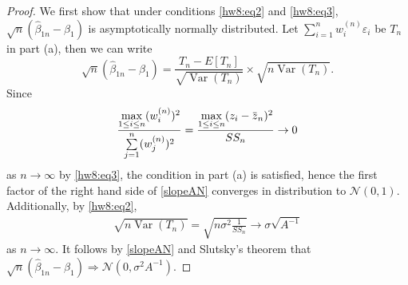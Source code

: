 \documentclass{article}
\newcommand{\eps}{\varepsilon}
\newcommand{\overbar}[1]{\mkern 1.5mu\overline{\mkern-1.5mu#1\mkern-1.5mu}\mkern 1.5mu}
\newcommand{\gaussian}{\mathcal{N}}
\DeclareMathOperator*{\Var}{Var}
\theoremstyle{definition}
\theoremstyle{plain}
\theoremstyle{remark}
\begin{document}
\begin{description}
\begin{description}
\begin{proof}
We first show that under conditions \eqref{hw8:eq2} and \eqref{hw8:eq3}, $\sqrt{n}(\hat{\beta}_{1n} - \beta_1)$ is asymptotically normally distributed. Let $\sum\limits_{i = 1}^n w_i^{(n)} \eps_i$ be $T_n$ in part (a), then 
we can write
\begin{equation}\label{slopeAN}
\sqrt{n}(\hat{\beta}_{1n} - \beta_1) = \frac{T_n - E[T_n]}{\sqrt{\Var(T_n)}} \times \sqrt{n \Var(T_n)}.
\end{equation}
Since
$$\frac{\max\limits_{1 \leq i \leq n} (w_i^{(n)})^2}{\sum\limits_{j = 1}^n (w_j^{(n)})^2} = \frac{\max\limits_{1 \leq i \leq n} (z_i - \overbar{z}_n)^2}{SS_n} \to 0$$
as $n \to \infty$ by \eqref{hw8:eq3}, the condition in part (a) is satisfied, hence the first factor of the right hand side of \eqref{slopeAN} converges in distribution to $\gaussian(0, 1)$. Additionally, by \eqref{hw8:eq2}, 
\begin{align*}
\sqrt{n\Var(T_n)} = \sqrt{n \sigma^2 \frac{1}{SS_n}} \to \sigma \sqrt{A^{-1}}
\end{align*}
as $n \to \infty$. It follows by \eqref{slopeAN} and Slutsky's theorem that $\sqrt{n}(\hat{\beta}_{1n} - \beta_1) \Rightarrow \gaussian(0, \sigma^2 A^{-1})$.


\end{proof}
\end{description}
\end{description}
\end{document}
